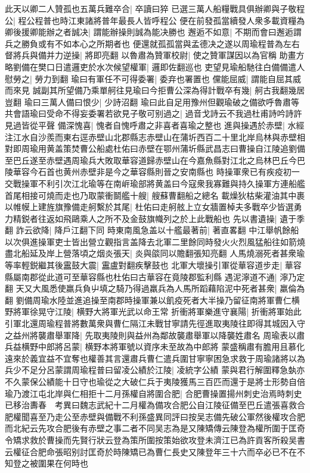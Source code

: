 此天以卿二人贊孤也五萬兵難卒合|{
	卒讀曰猝}
已選三萬人船糧戰具俱辦卿與子敬程公|{
	程公程普也時江東諸將普年最長人皆呼程公}
便在前發孤當續發人衆多載資糧為卿後援卿能辦之者誠决|{
	謂能辦操則誠為能决勝也}
邂逅不如意|{
	不期而會曰邂逅謂兵之勝負或有不如本心之所期者也}
便還就孤孤當與孟德决之遂以周瑜程普為左右督將兵與備并力逆操|{
	將即亮翻}
以魯肅為贊軍校尉|{
	使之贊軍謀因以為官稱}
助畫方略劉備在樊口日遣邏吏於水次候望權軍|{
	邏即佐翻巡也}
吏望見瑜船馳往白備備遣人慰勞之|{
	勞力到翻}
瑜曰有軍任不可得委署|{
	委弃也署置也}
儻能屈威|{
	謂能自屈其威而來見}
誠副其所望備乃乘單舸往見瑜曰今拒曹公深為得計戰卒有幾|{
	舸古我翻幾居豈翻}
瑜曰三萬人備曰恨少|{
	少詩沼翻}
瑜曰此自足用豫州但觀瑜破之備欲呼魯肅等共會語瑜曰受命不得妄委署若欲見子敬可别過之|{
	過音戈詩云不我過杜甫詩吟詩許見過皆從平聲}
備深愧喜|{
	愧者自愧呼肅之非喜者喜瑜之整也}
進與操遇於赤壁|{
	水經注江水自沙羨而東右逕赤壁山北郡縣志赤壁山在蒲圻西百二十里北岸烏林與赤壁相對即周瑜用黄盖策焚曹公船處杜佑曰赤壁在鄂州蒲圻縣武昌志曰曹操自江陵追劉備至巴丘遂至赤壁遇周瑜兵大敗取華容道歸赤壁山在今嘉魚縣對江北之烏林巴丘今巴陵華容今石首也黄州赤壁非是今之華容縣則晉之安南縣也}
時操軍衆已有疾疫初一交戰操軍不利引次江北瑜等在南㟁瑜部將黄盖曰今寇衆我寡難與持久操軍方連船艦首尾相接可燒而走也乃取蒙衝鬬艦十艘|{
	艘蘇曹翻船之總名}
載燥狄枯柴灌油其中裹以帷幙上建旌旗豫備走舸繫於其尾|{
	杜佑曰走舸舷上立女牆置棹夫多戰卒少皆選勇力精鋭者往返如飛鷗乘人之所不及金鼓旗幟列之於上此戰船也}
先以書遺操|{
	遺于季翻}
詐云欲降|{
	降戶江翻下同}
時東南風急盖以十艦最著前|{
	著直畧翻}
中江舉帆餘船以次俱進操軍吏士皆出營立觀指言盖降去北軍二里餘同時發火火烈風猛船往如箭燒盡北船延及岸上營落頃之烟炎張天|{
	炎與燄同以贍翻張知亮翻}
人馬燒溺死者甚衆瑜等率輕鋭繼其後靁鼓大震|{
	靁盧對翻疾擊鼓也}
北軍大壞操引軍從華容道步走|{
	華容縣屬南郡從此道可至華容縣也杜佑曰古華容在竟陵郡監利縣}
遇泥濘道不通|{
	濘乃定翻}
天又大風悉使羸兵負屮填之騎乃得過羸兵為人馬所蹈藉陷泥中死者甚衆|{
	羸倫為翻}
劉備周瑜水陸並進追操至南郡時操軍兼以飢疫死者大半操乃留征南將軍曹仁横野將軍徐晃守江陵|{
	横野大將軍光武以命王常}
折衝將軍樂進守襄陽|{
	折衝將軍始此}
引軍北還周瑜程普將數萬衆與曹仁隔江未戰甘寧請先徑進取夷陵往即得其城因入守之益州將襲肅舉軍降|{
	先取夷陵則與益州為鄰故襲肅舉軍以降襲姓肅名}
周瑜表以肅兵益横野中郎將呂蒙|{
	横野本將軍號以資序未至故為中郎將}
蒙盛稱肅有膽用且慕化遠來於義宜益不宜奪也權善其言還肅兵曹仁遣兵圍甘寧寧困急求救于周瑜諸將以為兵少不足分呂蒙謂周瑜程普曰留凌公績於江陵|{
	凌統字公績}
蒙與君行解圍釋急埶亦不久蒙保公績能十日守也瑜從之大破仁兵于夷陵獲馬三百匹而還于是將士形勢自倍瑜乃渡江屯北岸與仁相拒十二月孫權自將圍合肥|{
	合肥曹操置揚州刺史治焉時刺史已移治夀春　考異曰魏志武紀十二月權為備攻合肥公自江陵征備至巴丘遣張喜救合肥權聞喜至乃走公至赤壁與備戰不利孫盛異同評曰按吴志備先破公軍然後權攻合肥而北紀云先攻合肥後有赤壁之事二者不同吴志為是又陳矯傳云陳登為權所圍于匡奇令矯求救於曹操而先賢行狀云登為策所圍按策始欲攻登未濟江已為許貢客所殺吴書云權征合肥命張昭别討匡奇於時陳矯已為曹仁長史又陳登年三十六而卒必已不在不知登之被圍果在何時也}
